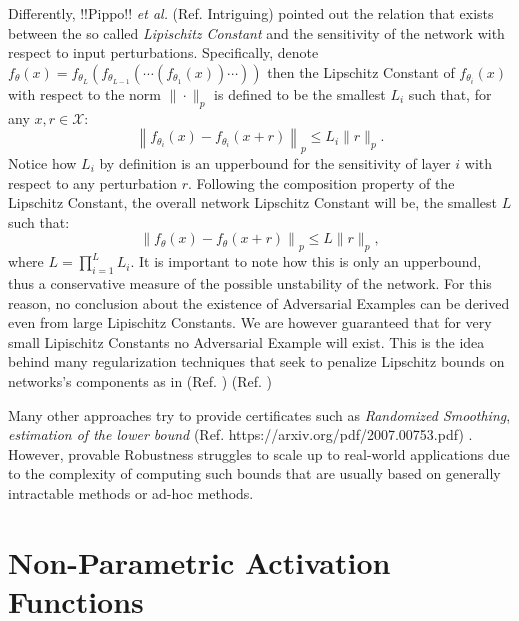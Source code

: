 \documentclass[LaM,binding=0.6cm]{./packages/sapthesis/sapthesis}
\begin{document}
            Differently, !!Pippo!! \textit{et al.} (Ref. Intriguing) pointed out the relation that exists 
            between the so called \textit{Lipischitz Constant} and the sensitivity of the network 
            with respect to input perturbations. Specifically, denote $f_{\theta}(x) = f_{\theta_L}(f_{\theta_{L-1}}(\cdots (f_{\theta_{1}}(x))\cdots)) $
            then the Lipschitz Constant of  $f_{\theta_i}(x)$ with respect to the norm $ \|\cdot\|_p $ is defined to be
            the smallest $L_i$ such that, for any $x, r \in \mathcal{X}$:
            \begin{equation}
                \label{LC}
                \left\|f_{\theta_i}\left(x \right)-f_{\theta_i}\left(x+r\right)\right\|_p \leq L_{i}\|r\|_p .
            \end{equation}
            Notice how $L_i$ by definition is an upperbound for the sensitivity of layer $i$ with respect
            to any perturbation $r$. Following the composition property of the
            Lipschitz Constant, the overall network Lipschitz Constant will be, the smallest $L$ such that:
            \begin{equation}
                \left\|f_{\theta}\left(x \right)-f_{\theta}\left(x+r\right)\right\|_p \leq L\|r\|_p,
            \end{equation}
            where $L=\prod_{i=1}^{L} L_{i}$. It is important to note how this is only an upperbound, thus a conservative
            measure of the possible unstability of the network. For this reason, no conclusion about the existence of 
            Adversarial Examples can be derived even from large Lipischitz Constants. We are however guaranteed 
            that for very small Lipischitz Constants no Adversarial Example will exist. This is the idea behind 
            many regularization techniques that seek to penalize Lipschitz bounds on networks's components as 
            in (Ref. ) (Ref. )

            Many other approaches try to provide certificates such as \textit{Randomized Smoothing}, \textit{estimation of the lower bound} (Ref. https://arxiv.org/pdf/2007.00753.pdf)
            . However, provable Robustness struggles to scale up to real-world applications
            due to the complexity of computing such bounds that are usually based on generally intractable methods or ad-hoc methods.





    \section{Non-Parametric Activation Functions}
\end{document}
